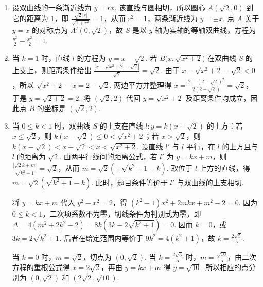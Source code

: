 \documentclass[UTF8,a4paper,oneside,11pt]{ctexbook}
\begin{document}
\begin{solution}
\begin{enumerate}
\item 设双曲线的一条渐近线为 \(y=rx\). 该直线与圆相切，所以圆心 \(A(\sqrt{2},0)\) 到它的距离为 \(1\)，即 \(\frac{\sqrt{2}|r|}{\sqrt{1+r^{2}}}=1\)，从而 \(r^{2}=1\)，两条渐近线为 \(y=\pm x\). 点 \(A\) 关于 \(y=x\) 的对称点为 \(A'(0,\sqrt{2})\)，故 \(S\) 是以 \(y\) 轴为实轴的等轴双曲线，方程为 \(\frac{y^{2}}{2}-\frac{x^{2}}{2}=1\).
\item 当 \(k=1\) 时，直线 \(l\) 的方程为 \(y=x-\sqrt{2}\). 若 \(B\bigl(x,\sqrt{x^{2}+2}\bigr)\) 在双曲线 \(S\) 的上支上，则距离条件给出 \(\frac{\left|x-\sqrt{x^{2}+2}-\sqrt{2}\right|}{\sqrt{2}}=\sqrt{2}\). 由于 \(x-\sqrt{x^{2}+2}-\sqrt{2}<0\)，所以 \(\sqrt{x^{2}+2}-x=2-\sqrt{2}\). 两边平方并整理得 \(x=\frac{2-(2-\sqrt{2})^{2}}{2(2-\sqrt{2})}=\sqrt{2}\)，于是 \(y=\sqrt{2+2}=2\). 将 \((\sqrt{2},2)\) 代回 \(y=\sqrt{x^{2}+2}\) 及距离条件均成立，因此点 \(B\) 的坐标是 \((\sqrt{2},2)\).
\item 当 \(0\leqslant k<1\) 时，双曲线 \(S\) 的上支在直线 \(l:y=k(x-\sqrt{2})\) 的上方：若 \(x\leqslant\sqrt{2}\)，则 \(k(x-\sqrt{2})\leqslant0<\sqrt{x^{2}+2}\)；若 \(x>\sqrt{2}\)，则 \(k(x-\sqrt{2})<x-\sqrt{2}<x<\sqrt{x^{2}+2}\). 设直线 \(l'\) 与 \(l\) 平行，在 \(l\) 的上方且与 \(l\) 的距离为 \(\sqrt{2}\). 由两平行线间的距离公式，若 \(l'\) 为 \(y=kx+m\)，则 \(\frac{|\sqrt{2}k+m|}{\sqrt{k^{2}+1}}=\sqrt{2}\)，从而 \(m=\sqrt{2}\left(\pm\sqrt{k^{2}+1}-k\right)\). 取位于 \(l\) 上方的直线，得 \(m=\sqrt{2}\left(\sqrt{k^{2}+1}-k\right)\). 此时，题目条件等价于 \(l'\) 与双曲线的上支相切.

将 \(y=kx+m\) 代入 \(y^{2}-x^{2}=2\)，得 \((k^{2}-1)x^{2}+2mkx+m^{2}-2=0\). 因为 \(0\leqslant k<1\)，二次项系数不为零，切线条件为判别式为零，即 \(\Delta=4(m^{2}+2k^{2}-2)=8k\left(3k-2\sqrt{k^{2}+1}\right)=0\). 因而 \(k=0\)，或 \(3k=2\sqrt{k^{2}+1}\). 后者在给定范围内等价于 \(9k^{2}=4(k^{2}+1)\)，故 \(k=\frac{2\sqrt{5}}{5}\).

当 \(k=0\) 时，\(m=\sqrt{2}\)，切点为 \((0,\sqrt{2})\). 当 \(k=\frac{2\sqrt{5}}{5}\) 时，\(m=\frac{\sqrt{10}}{5}\)，由二次方程的重根公式得 \(x=2\sqrt{2}\)，再由 \(y=kx+m\) 得 \(y=\sqrt{10}\). 所以相应的点分别为 \((0,\sqrt{2})\) 和 \((2\sqrt{2},\sqrt{10})\).
\end{enumerate}
\end{solution}
\end{document}
